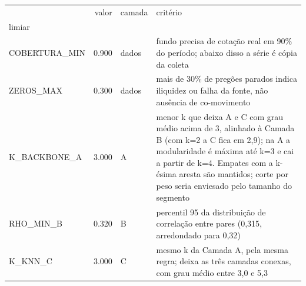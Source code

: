 \begin{tabular}{lrll}
\toprule
 & valor & camada & critério \\
limiar &  &  &  \\
\midrule
COBERTURA\_MIN & 0.900 & dados & fundo precisa de cotação real em 90\% do período; abaixo disso a série é cópia da coleta \\
ZEROS\_MAX & 0.300 & dados & mais de 30\% de pregões parados indica iliquidez ou falha da fonte, não ausência de co-movimento \\
K\_BACKBONE\_A & 3.000 & A & menor k que deixa A e C com grau médio acima de 3, alinhado à Camada B (com k=2 a C fica em 2,9); na A a modularidade é máxima até k=3 e cai a partir de k=4. Empates com a k-ésima aresta são mantidos; corte por peso seria enviesado pelo tamanho do segmento \\
RHO\_MIN\_B & 0.320 & B & percentil 95 da distribuição de correlação entre pares (0,315, arredondado para 0,32) \\
K\_KNN\_C & 3.000 & C & mesmo k da Camada A, pela mesma regra; deixa as três camadas conexas, com grau médio entre 3,0 e 5,3 \\
\bottomrule
\end{tabular}

